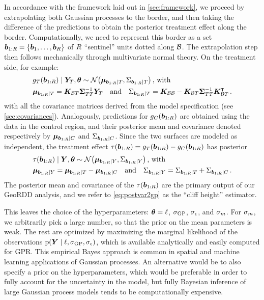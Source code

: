 In accordance with the framework laid out in \autoref{sec:framework}, we proceed by extrapolating both Gaussian processes to the border,
and then taking the difference of the predictions to obtain the posterior treatment effect along the border.
Computationally, we need to represent this border as a set \(\bm{b}_{1:R}=\left\lbrace\bm{b}_1,\ldots,\bm{b}_R\right\rbrace\) of \(R\) ``sentinel'' units dotted along \(\mathcal{B}\).
The extrapolation step then follows mechanically through multivariate normal theory.
On the treatment side, for example:
\begin{equation}\begin{split}
    & g_\treat{}(\sentinels) \mid \yt{}, \hyperparam \sim \normal\del{\muvec_{\sentinels \mid T}, \Sigma_{\sentinels \mid T}} \,\text{, with} \\
    & \muvec_{\sentinels \mid T} =
    \KBT
    \STT^{-1} 
    \yt{} 
    \quad\text{and}\quad
    \Sigma_{\sentinels \mid T} =
    \KBB - \KBT \STT^{-1} \KBT\trans \,.
\end{split}
\label{eq:postvar2gp_t_or_c}
\end{equation}
with all the covariance matrices derived from the model specification (see \autoref{sec:covariances}).
Analogously, predictions for \(g_C{}(\bm{b}_{1:R})\) are obtained using the data in the control region,
and their posterior mean and covariance denoted respectively by \(\bm{\mu}_{\bm{b}_{1:R} \mid C}\) and \(\Sigma_{\bm{b}_{1:R} \mid C}\).
Since the two surfaces are modeled as independent, the treatment effect \(\tau(\bm{b}_{1:R})=g_T{}(\bm{b}_{1:R})-g_C{}(\bm{b}_{1:R})\) has posterior
\begin{equation}
    \begin{split}
        & \tau(\sentinels) \mid \Yvec, \hyperparam \sim \normal\del{\muvec_{\sentinels \mid Y}, \Sigma_{\sentinels \mid Y}} \,\text{, with}\\
        & \muvec_{\sentinels \mid Y} = \muvec_{\sentinels \mid \treat} - \muvec_{\sentinels \mid \ctrol} \quad\text{and}\quad
        \Sigma_{\sentinels \mid Y} = \Sigma_{\sentinels \mid \treat} + \Sigma_{\sentinels \mid \ctrol} \,.
    \end{split}
    \label{eq:postvar2gp}
\end{equation}
The posterior mean and covariance of the \(\tau(\bm{b}_{1:R})\) are the primary output of our GeoRDD analysis, and we refer to \autoref{eq:postvar2gp} as the ``cliff height'' estimator.

This leaves the choice of the hyperparameters: \(\bm{\theta}=\ell\), \(\sigma_{\mathrm{GP}}\), \(\sigma_{\epsilon}\), and \(\sigma_{m}\).
For \(\sigma_{m}\), we arbitrarily pick a large number, so that the prior on the mean parameters is weak.
The rest are optimized by maximizing the marginal likelihood of the observations \(\prob\del{\Yvec \mid \ell, \sigmaf, \sigman}\), which is available analytically and easily computed for GPR.
This empirical Bayes approach is common in spatial and machine learning applications of Gaussian processes.
An alternative would be to also specify a prior on the hyperparameters, which would be preferable in order to fully account for the uncertainty in the model, but fully Bayesian inference of large Gaussian process models tends to be computationally expensive.


